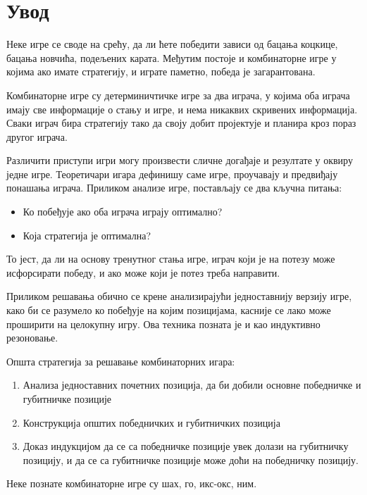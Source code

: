 \documentclass[a4paper]{article}
\begin{document}

\newpage
{}
\tableofcontents

\newpage
{}
\section{Увод}
\label{sec:uvod}

Неке игре се своде на срећу, да ли ћете победити зависи од бацања коцкице, бацања новчића, подељених карата. Међутим постоје и комбинаторне игре у којима ако имате стратегију, и играте паметно, победа је загарантована.

Комбинаторне игре су детерминичтичке игре за два играча, у којима оба играча имају све информације о стању и игре, и нема никаквих скривених информација. 
Сваки играч бира стратегију тако да своју добит пројектује и планира кроз пораз другог играча. 

Различити приступи игри могу произвести сличне догађаје и резултате у оквиру једне игре. Теоретичари игара дефинишу саме игре, проучавају и предвиђају понашања играча.
Приликом анализе игре, постављају се два кључна питања:
	\begin{itemize}
		\item Ко побеђује ако оба играча играју оптимално?
		\item Која стратегија је оптимална?
	\end{itemize}
То јест, да ли на основу тренутног стања игре, играч који је на потезу може исфорсирати победу, и ако може који је потез треба направити.

Приликом решавања обично се крене анализирајући једноставнију верзију игре, како би се разумело ко побеђује на којим позицијама, касније се лако може проширити на целокупну игру. Ова техника позната је и као индуктивно резоновање.

Општа стратегија за решавање комбинаторних игара:
\begin{enumerate}
	\item Анализа једноставних почетних позиција, да би добили основне победничке и губитничке позиције
	\item Конструкција општих победничких и губитничких позиција
	\item Доказ индукцијом да се са победничке позиције увек долази на губитничку позицију, и да се са губитничке позиције може доћи на победничку позицију.
\end{enumerate} 

Неке познате комбинаторне игре су шах, го, икс-окс, ним.
	
\end{document}
